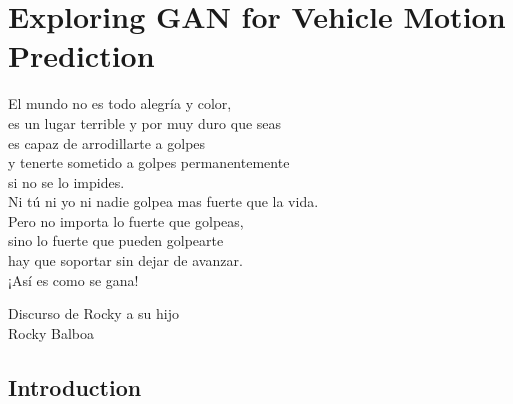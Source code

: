 % 
% 
% 
% 
% 
% 
% 

\chapter{Exploring GAN for Vehicle Motion Prediction}
\label{cha:exploring_gan_for_vehicle_mp}

\begin{FraseCelebre}
	\begin{Frase}
		El mundo no es todo alegría y color, \\
		es un lugar terrible y por muy duro que seas \\
		es capaz de arrodillarte a golpes \\
		y tenerte sometido a golpes permanentemente \\
		si no se lo impides. \\
		Ni tú ni yo ni nadie golpea mas fuerte que la vida. \\
		Pero no importa lo fuerte que golpeas, \\
		sino lo fuerte que pueden golpearte \\
		hay que soportar sin dejar de avanzar. \\
		¡Así es como se gana!
	\end{Frase}
	\begin{Fuente}
		Discurso de Rocky a su hijo \\
		Rocky Balboa
	\end{Fuente}
\end{FraseCelebre}

\section{Introduction}
\label{sec:5_introduction}

